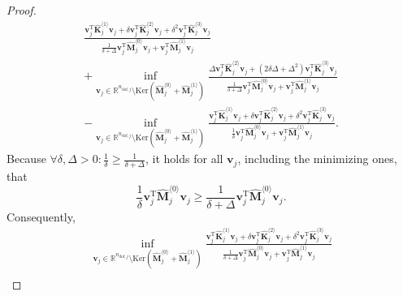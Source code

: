 \documentclass[10pt,a4paper]{amsart}
\begin{document}
\begin{proposition}
\begin{proof}
\begin{multline}
	\frac{\mathbf{v}_j^\mathrm{T} \hat{\mathbf{K}}_j^{\langle 1\rangle}\mathbf{v}_j + \delta \mathbf{v}_j^\mathrm{T}\hat{\mathbf{K}}_j^{\langle 2\rangle} \mathbf{v}_j + \delta^2 \mathbf{v}_j^\mathrm{T}\hat{\mathbf{K}}_j^{\langle 3\rangle} \mathbf{v}_j}{\frac{1}{\delta + \Delta}\mathbf{v}_j^\mathrm{T} \hat{\mathbf{M}}_j^{\langle 0\rangle} \mathbf{v}_j + \mathbf{v}_j^\mathrm{T} \hat{\mathbf{M}}_j^{\langle 1\rangle} \mathbf{v}_j} \\
	+ \inf_{\mathbf{v}_j \in \mathbb{R}^{n_{\mathrm{dof},j}}\setminus \mathrm{Ker}\left(\hat{\mathbf{M}}_j^{\langle 0\rangle}+\hat{\mathbf{M}}_j^{\langle 1\rangle}\right)} 
	\frac{\Delta \mathbf{v}_j^\mathrm{T}\hat{\mathbf{K}}_j^{\langle 2\rangle} \mathbf{v}_j + (2\delta \Delta + \Delta^2) \mathbf{v}_j^\mathrm{T}\hat{\mathbf{K}}_j^{\langle 3\rangle} \mathbf{v}_j}{\frac{1}{\delta + \Delta}\mathbf{v}_j^\mathrm{T} \hat{\mathbf{M}}_j^{\langle 0\rangle} \mathbf{v}_j + \mathbf{v}_j^\mathrm{T} \hat{\mathbf{M}}_j^{\langle 1\rangle} \mathbf{v}_j}\\
	- \inf_{\mathbf{v}_j \in \mathbb{R}^{n_{\mathrm{dof},j}}\setminus \mathrm{Ker}\left(\hat{\mathbf{M}}_j^{\langle 0\rangle}+\hat{\mathbf{M}}_j^{\langle 1\rangle}\right)} \frac{\mathbf{v}_j^\mathrm{T} \hat{\mathbf{K}}_j^{\langle 1\rangle}\mathbf{v}_j + \delta \mathbf{v}_j^\mathrm{T}\hat{\mathbf{K}}_j^{\langle 2\rangle} \mathbf{v}_j + \delta^2 \mathbf{v}_j^\mathrm{T}\hat{\mathbf{K}}_j^{\langle 3\rangle} \mathbf{v}_j}{\frac{1}{\delta}\mathbf{v}_j^\mathrm{T} \hat{\mathbf{M}}_j^{\langle 0\rangle} \mathbf{v}_j + \mathbf{v}_j^\mathrm{T} \hat{\mathbf{M}}_j^{\langle 1\rangle} \mathbf{v}_j}.
\end{multline}
%
Because $\forall \delta,\Delta >0: \frac{1}{\delta} \ge \frac{1}{\delta + \Delta}$, it holds for all $\mathbf{v}_j$, including the minimizing ones, that
\begin{equation}
	\frac{1}{\delta}\mathbf{v}_j^\mathrm{T} \hat{\mathbf{M}}_j^{\langle 0\rangle} \mathbf{v}_j \ge \frac{1}{\delta + \Delta}\mathbf{v}_j^\mathrm{T} \hat{\mathbf{M}}_j^{\langle 0\rangle} \mathbf{v}_j.
\end{equation}
%
Consequently,
% 
\begin{multline}
	\inf_{\mathbf{v}_j \in \mathbb{R}^{n_{\mathrm{dof},j}}\setminus \mathrm{Ker}\left(\hat{\mathbf{M}}_j^{\langle 0\rangle}+\hat{\mathbf{M}}_j^{\langle 1\rangle}\right)} 
	\frac{\mathbf{v}_j^\mathrm{T} \hat{\mathbf{K}}_j^{\langle 1\rangle}\mathbf{v}_j + \delta \mathbf{v}_j^\mathrm{T}\hat{\mathbf{K}}_j^{\langle 2\rangle} \mathbf{v}_j + \delta^2 \mathbf{v}_j^\mathrm{T}\hat{\mathbf{K}}_j^{\langle 3\rangle} \mathbf{v}_j}{\frac{1}{\delta + \Delta}\mathbf{v}_j^\mathrm{T} \hat{\mathbf{M}}_j^{\langle 0\rangle} \mathbf{v}_j + \mathbf{v}_j^\mathrm{T} \hat{\mathbf{M}}_j^{\langle 1\rangle} \mathbf{v}_j} \\

\end{multline}
\end{proof}
\end{proposition}
\end{document}
